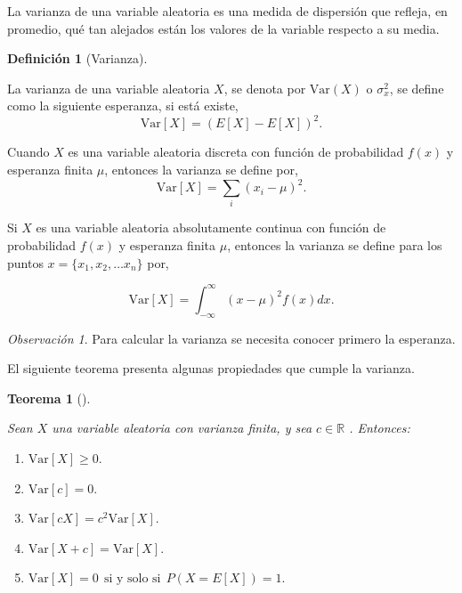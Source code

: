 \documentclass[
  us-letterpaper,
]{scrreprt}
\providecommand{\tightlist}{%
  \setlength{\itemsep}{0pt}\setlength{\parskip}{0pt}}\usepackage{longtable,booktabs,array}
\theoremstyle{plain}
\newtheorem{theorem}{Teorema}[chapter]
\theoremstyle{definition}
\newtheorem{definition}{Definición}[chapter]
\theoremstyle{definition}
\theoremstyle{remark}
\newtheorem*{remark}{Observación}
\begin{document}
La varianza de una variable aleatoria es una medida de dispersión que
refleja, en promedio, qué tan alejados están los valores de la variable
respecto a su media.

\begin{definition}[Varianza]\protect\hypertarget{def-vari}{}\label{def-vari}

La varianza de una variable aleatoria \(X\), se denota por
\(\mathrm{Var}(X)\) o \(\sigma_x^2\), se define como la siguiente
esperanza, si está existe, \[ \mathrm{Var}[X]=  (E[X]-E[X])^2.\]

Cuando \(X\) es una variable aleatoria discreta con función de
probabilidad \(f(x)\) y esperanza finita \(\mu\), entonces la varianza
se define por, \[ \mathrm{Var}[X]=  \sum_i (x_i - \mu)^2.\]

Si \(X\) es una variable aleatoria absolutamente continua con función de
probabilidad \(f(x)\) y esperanza finita \(\mu\), entonces la varianza
se define para los puntos \(x= \{x_1,x_2,\dots x_n\}\) por,

\[\mathrm{Var}[X]= \int_{-\infty}^\infty (x-\mu)^2 f(x) dx.\]

\end{definition}

\begin{remark}
Para calcular la varianza se necesita conocer primero la esperanza.
\end{remark}

El siguiente teorema presenta algunas propiedades que cumple la
varianza.

\begin{theorem}[]\protect\hypertarget{thm-varianza}{}\label{thm-varianza}

Sean \(X\) una variable aleatoria con varianza finita, y sea
\(c \in \mathbb{R}\) . Entonces:

\begin{enumerate}
\def\labelenumi{\arabic{enumi}.}
\tightlist
\item
  \(\mathrm{Var}[X] \geq 0.\)
\item
  \(\mathrm{Var}[c] = 0.\)
\item
  \(\mathrm{Var}[cX] = c^2 \mathrm{Var}[X].\)
\item
  \(\mathrm{Var}[X+c] =  \mathrm{Var}[X].\)
\item
  \(\mathrm{Var}[X] = 0 \ \ \text{si y solo si} \ \ P(X= E[X])=1 .\)
\end{enumerate}

\end{theorem}
\end{document}
